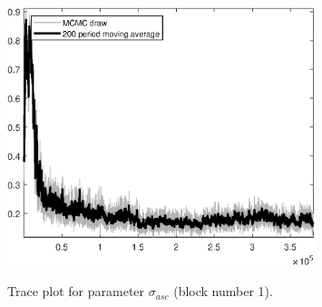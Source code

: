 \begin{figure}[H]
\centering
  \includegraphics[width=0.8\textwidth]{BRS_sectoral/graphs/TracePlot_sigma_asc_blck_1}\\
    \caption{Trace plot for parameter ${\sigma_{asc}}$ (block number 1).}
\end{figure}
